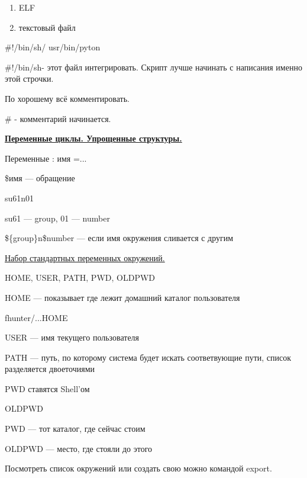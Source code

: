 \begin{enumerate}
	\item \par 
	ELF
	\item \par 
	текстовый файл
\end{enumerate}
\par 
\#!/bin/sh/        usr/bin/pyton
\par 
\#!/bin/sh- этот файл интегрировать. Скрипт
лучше начинать с написания именно этой
строчки.
\par 
По хорошему всё комментировать.
\par 
\# - комментарий начинается.

\par \underline{\textbf{Переменные
циклы. Упрощенные структуры.}}
\par 
Переменные : имя =...
\par 
\$имя — обращение
\par 
su61n01
\par 
su61 — group, 01 — number
\par 
\$\{group\}n\$number — если имя окружения сливается
с другим

\par 
\underline{Набор стандартных переменных окружений.}
\par 
HOME, USER, PATH, PWD, OLDPWD
\par 
HOME — показывает где лежит домашний
каталог пользователя
\par 
fhunter/...HOME
\par 
USER — имя текущего пользователя
\par 
PATH — путь, по которому система будет
искать соответвующие пути, список
разделяется двоеточиями
\par PWD
            ставятся Shell'ом
\par 
OLDPWD
\par 
PWD — тот каталог, где сейчас стоим
\par 
OLDPWD — место, где стояли до этого
\par 
Посмотреть список окружений или создать
свою можно командой export.

